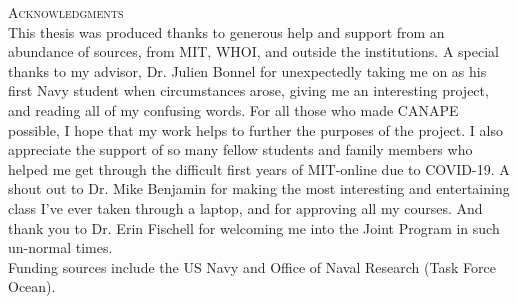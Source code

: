 
\noindent
\begin{singlespace}
{\parindent0pt
	{\large \textsc{Acknowledgments}} \\

	This thesis was produced thanks to generous help and support from an abundance of sources, from MIT, WHOI, and outside the institutions. A special thanks to my advisor, Dr. Julien Bonnel for unexpectedly taking me on as his first Navy student when circumstances arose, giving me an interesting project, and reading all of my confusing words. For all those who made CANAPE possible, I hope that my work helps to further the purposes of the project. I also appreciate the support of so many fellow students and family members who helped me get through the difficult first years of MIT-online due to COVID-19. A shout out to Dr. Mike Benjamin for making the most interesting and entertaining class I've ever taken through a laptop, and for approving all my courses. And thank you to Dr. Erin Fischell for welcoming me into the Joint Program in such un-normal times. \\
	Funding sources include the US Navy and Office of Naval Research (Task Force Ocean). 
}

\end{singlespace}

\newpage
\null
\newpage